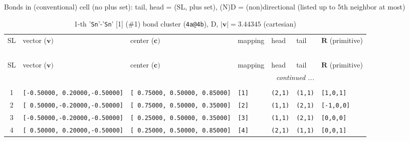 \documentclass[fleqn,10pt,landscape]{jsarticle}
\begin{document}
\noindent Bonds in (conventional) cell (no plus set): tail, head = (SL, plus set), (N)D = (non)directional (listed up to 5th neighbor at most)

\renewcommand{\arraystretch}{1.6}
\begin{longtable}[l]{cllllll}
\captionsetup{justification=raggedright, singlelinecheck=off}
\caption{1-th '\texttt{Sn}'-'\texttt{Sn}' [1] (\#1) bond cluster (\texttt{4a@4b}), D, $|\bm{v}|=3.44345$ (cartesian)}
 \\
 \hline \hline
SL & vector ($\bm{v})$ & center ($\bm{c})$ & mapping & head & tail & $\bm{R}$ (primitive) \\ \hline \endfirsthead

\multicolumn{6}{l}{\tablename\ \thetable{}} \\
 \hline \hline
SL & vector ($\bm{v})$ & center ($\bm{c})$ & mapping & head & tail & $\bm{R}$ (primitive) \\ \hline \endhead

 \hline \hline
\multicolumn{6}{r}{\footnotesize\it continued ...} \\ \endfoot

 \hline \hline
\multicolumn{6}{r}{} \\ \endlastfoot

1 & \texttt{[-0.50000, 0.20000,-0.50000]} & \texttt{[ 0.75000, 0.50000, 0.85000]} & \texttt{[1]} & \texttt{(2,1)} & \texttt{(1,1)} & \texttt{[1,0,1]} \\ \hline
2 & \texttt{[ 0.50000,-0.20000,-0.50000]} & \texttt{[ 0.75000, 0.50000, 0.35000]} & \texttt{[2]} & \texttt{(1,1)} & \texttt{(2,1)} & \texttt{[-1,0,0]} \\ \hline
3 & \texttt{[-0.50000,-0.20000,-0.50000]} & \texttt{[ 0.25000, 0.50000, 0.35000]} & \texttt{[3]} & \texttt{(1,1)} & \texttt{(2,1)} & \texttt{[0,0,0]} \\ \hline
4 & \texttt{[ 0.50000, 0.20000,-0.50000]} & \texttt{[ 0.25000, 0.50000, 0.85000]} & \texttt{[4]} & \texttt{(2,1)} & \texttt{(1,1)} & \texttt{[0,0,1]} \\
\end{longtable}
\renewcommand{\arraystretch}{1.6}
\end{document}

